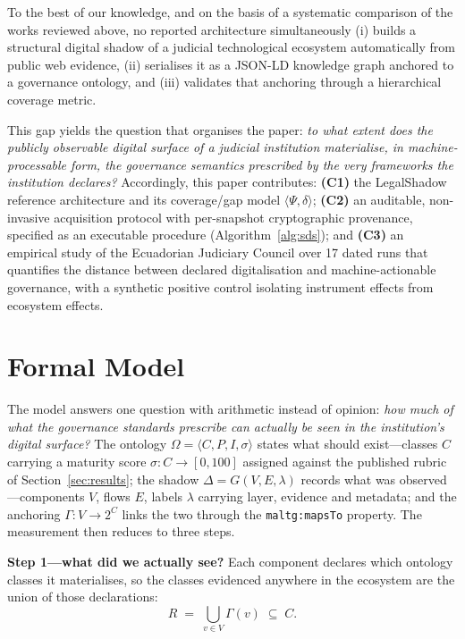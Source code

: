 \documentclass[engproc,proceedingpaper,submit,moreauthors]{Definitions/mdpi}
\begin{document}
    To the best of our knowledge, and on the basis of a systematic comparison of the works reviewed above, no reported architecture simultaneously (i) builds a structural digital shadow of a judicial technological ecosystem automatically from public web evidence, (ii) serialises it as a JSON-LD knowledge graph anchored to a governance ontology, and (iii) validates that anchoring through a hierarchical coverage metric.

    This gap yields the question that organises the paper: \emph{to what extent does the publicly observable digital surface of a judicial institution materialise, in machine-processable form, the governance semantics prescribed by the very frameworks the institution declares?} Accordingly, this paper contributes: \textbf{(C1)} the LegalShadow reference architecture and its coverage/gap model $\langle\Psi,\delta\rangle$; \textbf{(C2)} an auditable, non-invasive acquisition protocol with per-snapshot cryptographic provenance, specified as an executable procedure (Algorithm~\ref{alg:sds}); and \textbf{(C3)} an empirical study of the Ecuadorian Judiciary Council over 17 dated runs that quantifies the distance between declared digitalisation and machine-actionable governance, with a synthetic positive control isolating instrument effects from ecosystem effects.

\section{Formal Model}
\label{sec:formal}

The model answers one question with arithmetic instead of opinion: \emph{how much of what the governance standards prescribe can actually be seen in the institution's digital surface?} The ontology $\Omega=\langle C,P,I,\sigma\rangle$ states what should exist---classes $C$ carrying a maturity score $\sigma:C\to[0,100]$ assigned against the published rubric of Section~\ref{sec:results}; the shadow $\Delta=G(V,E,\lambda)$ records what was observed---components $V$, flows $E$, labels $\lambda$ carrying layer, evidence and metadata; and the anchoring $\Gamma:V\to 2^{C}$ links the two through the \texttt{maltg:mapsTo} property. The measurement then reduces to three steps.

\textbf{Step 1---what did we actually see?} Each component declares which ontology classes it materialises, so the classes evidenced anywhere in the ecosystem are the union of those declarations:
\begin{equation}
R \;=\; \bigcup_{v \in V} \Gamma(v) \;\subseteq\; C .
\label{eq:coverage-set}
\end{equation}
\end{document}
